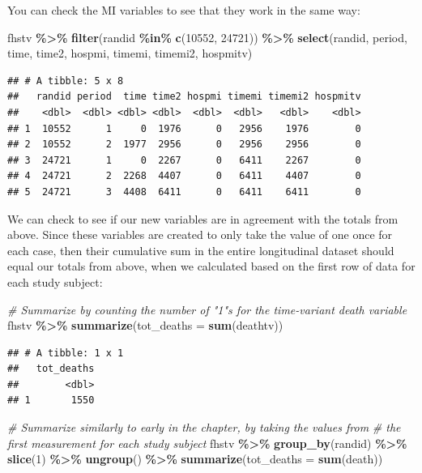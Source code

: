 \documentclass[
]{book}
\newenvironment{Shaded}{\begin{snugshade}}{\end{snugshade}}
\newcommand{\AttributeTok}[1]{\textcolor[rgb]{0.13,0.29,0.53}{#1}}
\newcommand{\CommentTok}[1]{\textcolor[rgb]{0.56,0.35,0.01}{\textit{#1}}}
\newcommand{\DecValTok}[1]{\textcolor[rgb]{0.00,0.00,0.81}{#1}}
\newcommand{\FunctionTok}[1]{\textcolor[rgb]{0.13,0.29,0.53}{\textbf{#1}}}
\newcommand{\NormalTok}[1]{#1}
\newcommand{\SpecialCharTok}[1]{\textcolor[rgb]{0.81,0.36,0.00}{\textbf{#1}}}
\begin{document}
You can check the MI variables to see that they work in the same way:

\begin{Shaded}
\begin{Highlighting}[]
\NormalTok{fhstv }\SpecialCharTok{\%\textgreater{}\%} 
  \FunctionTok{filter}\NormalTok{(randid }\SpecialCharTok{\%in\%} \FunctionTok{c}\NormalTok{(}\DecValTok{10552}\NormalTok{, }\DecValTok{24721}\NormalTok{)) }\SpecialCharTok{\%\textgreater{}\%} 
  \FunctionTok{select}\NormalTok{(randid, period, time, time2, hospmi, timemi, timemi2, hospmitv)}
\end{Highlighting}
\end{Shaded}

\begin{verbatim}
## # A tibble: 5 x 8
##   randid period  time time2 hospmi timemi timemi2 hospmitv
##    <dbl>  <dbl> <dbl> <dbl>  <dbl>  <dbl>   <dbl>    <dbl>
## 1  10552      1     0  1976      0   2956    1976        0
## 2  10552      2  1977  2956      0   2956    2956        0
## 3  24721      1     0  2267      0   6411    2267        0
## 4  24721      2  2268  4407      0   6411    4407        0
## 5  24721      3  4408  6411      0   6411    6411        0
\end{verbatim}

We can check to see if our new variables are in agreement with the totals from above. Since these variables are created to only take the value of one once for each case, then their cumulative sum in the entire longitudinal dataset should equal our totals from above, when we calculated based on the first row of data for each study subject:

\begin{Shaded}
\begin{Highlighting}[]
\CommentTok{\# Summarize by counting the number of "1"s for the time{-}variant death variable}
\NormalTok{fhstv }\SpecialCharTok{\%\textgreater{}\%} 
  \FunctionTok{summarize}\NormalTok{(}\AttributeTok{tot\_deaths =} \FunctionTok{sum}\NormalTok{(deathtv))}
\end{Highlighting}
\end{Shaded}

\begin{verbatim}
## # A tibble: 1 x 1
##   tot_deaths
##        <dbl>
## 1       1550
\end{verbatim}

\begin{Shaded}
\begin{Highlighting}[]
\CommentTok{\# Summarize similarly to early in the chapter, by taking the values from }
\CommentTok{\# the first measurement for each study subject}
\NormalTok{fhstv }\SpecialCharTok{\%\textgreater{}\%} 
  \FunctionTok{group\_by}\NormalTok{(randid) }\SpecialCharTok{\%\textgreater{}\%} 
  \FunctionTok{slice}\NormalTok{(}\DecValTok{1}\NormalTok{) }\SpecialCharTok{\%\textgreater{}\%} 
  \FunctionTok{ungroup}\NormalTok{() }\SpecialCharTok{\%\textgreater{}\%} 
  \FunctionTok{summarize}\NormalTok{(}\AttributeTok{tot\_deaths =} \FunctionTok{sum}\NormalTok{(death))}
\end{Highlighting}
\end{Shaded}
\end{document}
